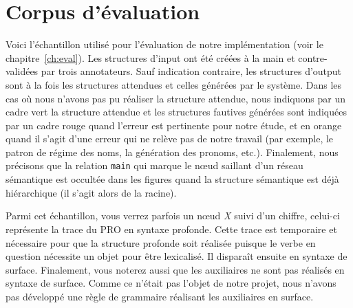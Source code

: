 
\chapter{Corpus d'évaluation}\label{ch:annexe}

Voici l'échantillon utilisé pour l'évaluation de notre implémentation (voir le chapitre~\ref{ch:eval}). Les structures d’input ont été créées à la main et contre-validées par trois annotateurs. Sauf indication contraire, les structures d'output sont à la fois les structures attendues et celles générées par le système. Dans les cas où nous n'avons pas pu réaliser la structure attendue, nous indiquons par un cadre vert la structure attendue et les structures fautives générées sont indiquées par un cadre rouge quand l'erreur est pertinente pour notre étude, et en orange quand il s'agit d'une erreur qui ne relève pas de notre travail (par exemple, le patron de régime des noms, la génération des pronoms, etc.). Finalement, nous précisons que la relation \texttt{main} qui marque le n\oe{}ud saillant d'un réseau sémantique est occultée dans les figures quand la structure sémantique est déjà hiérarchique (il s'agit alors de la racine).

Parmi cet échantillon, vous verrez parfois un n\oe{}ud \emph{X} suivi d'un chiffre, celui-ci représente la trace du PRO en syntaxe profonde. Cette trace est temporaire et nécessaire pour que la structure profonde soit réalisée puisque le verbe en question nécessite un objet pour être lexicalisé. Il disparaît ensuite en syntaxe de surface. Finalement, vous noterez aussi que les auxiliaires ne sont pas réalisés en syntaxe de surface. Comme ce n'était pas l'objet de notre projet, nous n'avons pas développé une règle de grammaire réalisant les auxiliaires en surface.

\begin{tabbing}
(17)\quad\= \emph{I loved writing.} \\*
\> \begin{minipage}{16cm}
}
\raisebox{-0.5\height}{~$\Rightarrow$~}
\raisebox{-0.5\height}{\texttt{[image: \{annexes/figs/test-eval-17.dsynt]}.jpg}}
\raisebox{-0.5\height}{~$\Rightarrow$~}
\raisebox{-0.5\height}{\texttt{[image: \{annexes/figs/test-eval-17.ssynt]}.jpg}}
\end{minipage}
\end{tabbing}

